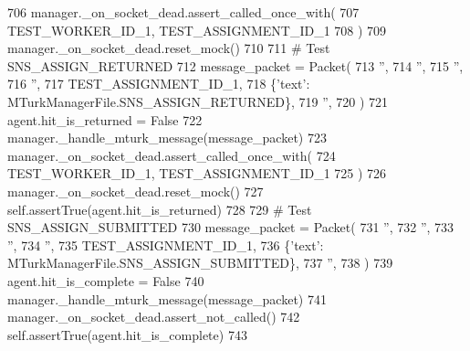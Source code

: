\begin{DoxyCode}
706         manager.\_on\_socket\_dead.assert\_called\_once\_with(
707             TEST\_WORKER\_ID\_1, TEST\_ASSIGNMENT\_ID\_1
708         )
709         manager.\_on\_socket\_dead.reset\_mock()
710 
711         \textcolor{comment}{# Test SNS\_ASSIGN\_RETURNED}
712         message\_packet = Packet(
713             \textcolor{stringliteral}{''},
714             \textcolor{stringliteral}{''},
715             \textcolor{stringliteral}{''},
716             \textcolor{stringliteral}{''},
717             TEST\_ASSIGNMENT\_ID\_1,
718             \{\textcolor{stringliteral}{'text'}: MTurkManagerFile.SNS\_ASSIGN\_RETURNED\},
719             \textcolor{stringliteral}{''},
720         )
721         agent.hit\_is\_returned = \textcolor{keyword}{False}
722         manager.\_handle\_mturk\_message(message\_packet)
723         manager.\_on\_socket\_dead.assert\_called\_once\_with(
724             TEST\_WORKER\_ID\_1, TEST\_ASSIGNMENT\_ID\_1
725         )
726         manager.\_on\_socket\_dead.reset\_mock()
727         self.assertTrue(agent.hit\_is\_returned)
728 
729         \textcolor{comment}{# Test SNS\_ASSIGN\_SUBMITTED}
730         message\_packet = Packet(
731             \textcolor{stringliteral}{''},
732             \textcolor{stringliteral}{''},
733             \textcolor{stringliteral}{''},
734             \textcolor{stringliteral}{''},
735             TEST\_ASSIGNMENT\_ID\_1,
736             \{\textcolor{stringliteral}{'text'}: MTurkManagerFile.SNS\_ASSIGN\_SUBMITTED\},
737             \textcolor{stringliteral}{''},
738         )
739         agent.hit\_is\_complete = \textcolor{keyword}{False}
740         manager.\_handle\_mturk\_message(message\_packet)
741         manager.\_on\_socket\_dead.assert\_not\_called()
742         self.assertTrue(agent.hit\_is\_complete)
743 
\end{DoxyCode}
\mbox{\label{classparlai_1_1mturk_1_1core_1_1test_1_1test__mturk__manager_1_1TestMTurkManagerUnitFunctions_a6f4fb740af7a113e939b7db9979aac45}} 
